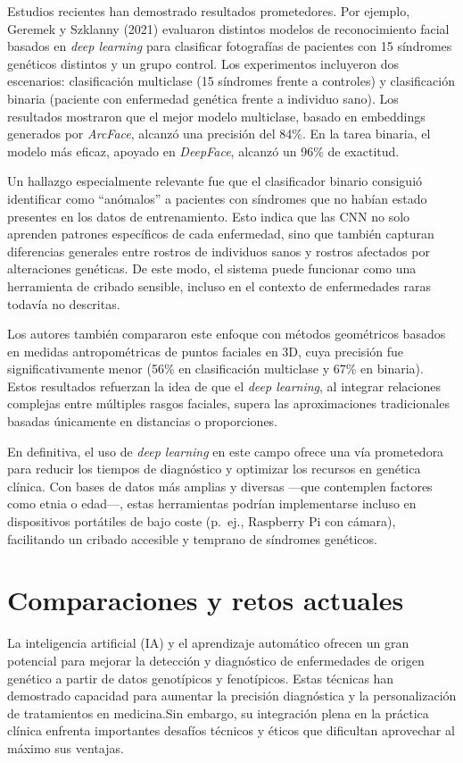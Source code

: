 \documentclass[11pt,a4paper,spanish]{book}
\numberwithin{equation}{chapter}
\numberwithin{figure}{chapter}
\begin{document}
Estudios recientes han demostrado resultados prometedores. Por ejemplo, Geremek y Szklanny (2021) evaluaron distintos modelos de reconocimiento facial basados en \textit{deep learning} para clasificar fotografías de pacientes con 15 síndromes genéticos distintos y un grupo control. Los experimentos incluyeron dos escenarios: clasificación multiclase (15 síndromes frente a controles) y clasificación binaria (paciente con enfermedad genética frente a individuo sano). Los resultados mostraron que el mejor modelo multiclase, basado en embeddings generados por \textit{ArcFace}, alcanzó una precisión del 84\%. En la tarea binaria, el modelo más eficaz, apoyado en \textit{DeepFace}, alcanzó un 96\% de exactitud.\cite{s21196595}

Un hallazgo especialmente relevante fue que el clasificador binario consiguió identificar como “anómalos” a pacientes con síndromes que no habían estado presentes en los datos de entrenamiento. Esto indica que las CNN no solo aprenden patrones específicos de cada enfermedad, sino que también capturan diferencias generales entre rostros de individuos sanos y rostros afectados por alteraciones genéticas. De este modo, el sistema puede funcionar como una herramienta de cribado sensible, incluso en el contexto de enfermedades raras todavía no descritas\cite{gurovich2019,s21196595}.  

Los autores también compararon este enfoque con métodos geométricos basados en medidas antropométricas de puntos faciales en 3D, cuya precisión fue significativamente menor (56\% en clasificación multiclase y 67\% en binaria). Estos resultados refuerzan la idea de que el \textit{deep learning}, al integrar relaciones complejas entre múltiples rasgos faciales, supera las aproximaciones tradicionales basadas únicamente en distancias o proporciones.  

En definitiva, el uso de \textit{deep learning} en este campo ofrece una vía prometedora para reducir los tiempos de diagnóstico y optimizar los recursos en genética clínica. Con bases de datos más amplias y diversas —que contemplen factores como etnia o edad—, estas herramientas podrían implementarse incluso en dispositivos portátiles de bajo coste (p.~ej., Raspberry Pi con cámara), facilitando un cribado accesible y temprano de síndromes genéticos.\cite{s21196595}

\section{Comparaciones y retos actuales}
La inteligencia artificial (IA) y el aprendizaje automático ofrecen un gran potencial para mejorar la detección y diagnóstico de enfermedades de origen genético a partir de datos genotípicos y fenotípicos. Estas técnicas han demostrado capacidad para aumentar la precisión diagnóstica y la personalización de tratamientos en medicina.Sin embargo, su integración plena en la práctica clínica enfrenta importantes desafíos técnicos y éticos que dificultan aprovechar al máximo sus ventajas.
\end{document}

